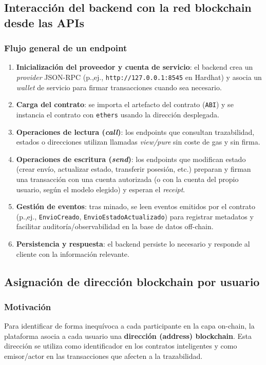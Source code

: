 \subsection{Interacción del backend con la red blockchain desde las APIs}
\subsubsection{Flujo general de un endpoint}
\begin{enumerate}
\item \textbf{Inicialización del proveedor y cuenta de servicio}: el backend crea un \textit{provider} JSON-RPC (p.,ej., \texttt{http://127.0.0.1:8545}
 en Hardhat) y asocia un \textit{wallet} de servicio para firmar transacciones cuando sea necesario.
\item \textbf{Carga del contrato}: se importa el artefacto del contrato (\texttt{ABI}) y se instancia el contrato con \texttt{ethers} usando la dirección desplegada.
\item \textbf{Operaciones de lectura (\textit{call})}: los endpoints que consultan trazabilidad, estados o direcciones utilizan llamadas \textit{view/pure} sin coste de gas y sin firma.
\item \textbf{Operaciones de escritura (\textit{send})}: los endpoints que modifican estado (crear envío, actualizar estado, transferir posesión, etc.) preparan y firman una transacción con una cuenta autorizada (o con la cuenta del propio usuario, según el modelo elegido) y esperan el \textit{receipt}.
\item \textbf{Gestión de eventos}: tras minado, se leen eventos emitidos por el contrato (p.,ej., \texttt{EnvioCreado}, \texttt{EnvioEstadoActualizado}) para registrar metadatos y facilitar auditoría/observabilidad en la base de datos off-chain.
\item \textbf{Persistencia y respuesta}: el backend persiste lo necesario y responde al cliente con la información relevante.
\end{enumerate}

\subsection{Asignación de dirección blockchain por usuario}
\subsubsection{Motivación}
Para identificar de forma inequívoca a cada participante en la capa on-chain, la plataforma asocia a cada usuario una \textbf{dirección (address) blockchain}. Esta dirección se utiliza como identificador en los contratos inteligentes y como emisor/actor en las transacciones que afecten a la trazabilidad.

